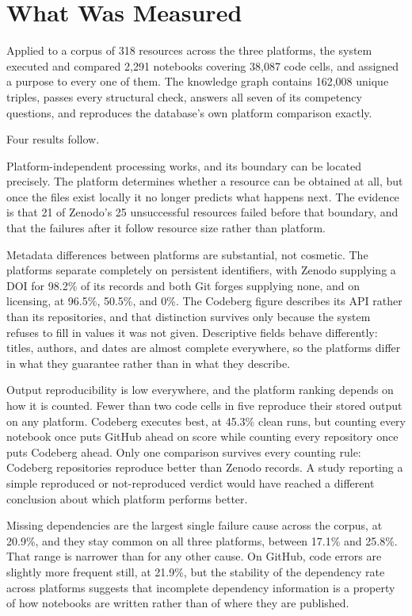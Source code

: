 \section{What Was Measured}

Applied to a corpus of 318 resources across the three platforms, the system executed and compared 2{,}291 notebooks covering 38{,}087 code cells, and assigned a purpose to every one of them. The knowledge graph contains 162{,}008 unique triples, passes every structural check, answers all seven of its competency questions, and reproduces the database's own platform comparison exactly.

Four results follow.

Platform-independent processing works, and its boundary can be located precisely. The platform determines whether a resource can be obtained at all, but once the files exist locally it no longer predicts what happens next. The evidence is that 21 of Zenodo's 25 unsuccessful resources failed before that boundary, and that the failures after it follow resource size rather than platform.

Metadata differences between platforms are substantial, not cosmetic. The platforms separate completely on persistent identifiers, with Zenodo supplying a DOI for 98.2\% of its records and both Git forges supplying none, and on licensing, at 96.5\%, 50.5\%, and 0\%. The Codeberg figure describes its API rather than its repositories, and that distinction survives only because the system refuses to fill in values it was not given. Descriptive fields behave differently: titles, authors, and dates are almost complete everywhere, so the platforms differ in what they guarantee rather than in what they describe.

Output reproducibility is low everywhere, and the platform ranking depends on how it is counted. Fewer than two code cells in five reproduce their stored output on any platform. Codeberg executes best, at 45.3\% clean runs, but counting every notebook once puts GitHub ahead on score while counting every repository once puts Codeberg ahead. Only one comparison survives every counting rule: Codeberg repositories reproduce better than Zenodo records. A study reporting a simple reproduced or not-reproduced verdict would have reached a different conclusion about which platform performs better.

Missing dependencies are the largest single failure cause across the corpus, at 20.9\%, and they stay common on all three platforms, between 17.1\% and 25.8\%. That range is narrower than for any other cause. On GitHub, code errors are slightly more frequent still, at 21.9\%, but the stability of the dependency rate across platforms suggests that incomplete dependency information is a property of how notebooks are written rather than of where they are published.

